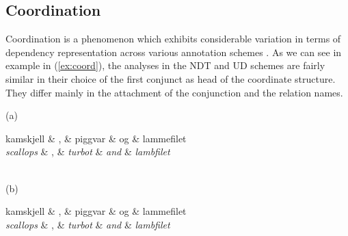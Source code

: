 \documentclass[10pt, a4paper]{article}
\let\w=\emph
\begin{document}
\subsection{Coordination}
Coordination is a phenomenon which exhibits considerable variation in terms
of dependency representation across various annotation schemes \cite{Pop:Mar:Ste:13}.
As we can see in example in (\ref{ex:coord}), the analyses
in the NDT and UD schemes are fairly similar in their choice of
the first conjunct as head of the coordinate structure. They differ
mainly in the attachment of the conjunction and the relation names.

\begin{example}
\label{ex:coord}
(a)\\
    \begin{dependency}
        \begin{deptext}[column sep=.2cm]
          kamskjell \& , \& piggvar \& og \& lammefilet \\
          \w{scallops} \& , \& \w{turbot} \& \w{and} \& \w{lambfilet}\\
        \end{deptext}
    \end{dependency}
\\(b)\\
    \begin{dependency}
        \begin{deptext}[column sep=.2cm]
          kamskjell \& , \& piggvar \& og \& lammefilet \\
          \w{scallops} \& , \& \w{turbot} \& \w{and} \& \w{lambfilet}\\
        \end{deptext}
    \end{dependency}
\end{example}
\end{document}
